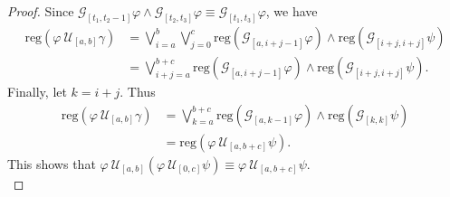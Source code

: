 \documentclass[runningheads]{llncs}
\renewcommand{\phi}{\varphi}
\begin{document}
\begin{proof}
Since $\mathcal{G}_{[t_1,t_2-1]}\phi \land \mathcal{G}_{[t_2,t_3]} \phi \equiv \mathcal{G}_{[t_1,t_3]} \phi$, we have
\begin{align*}
\text{reg}\left(\phi \ \mathcal{U}_{[a,b]}\gamma\right) &= \bigvee_{i=a}^{b}  \bigvee_{j=0}^{c} \text{reg}\left(\mathcal{G}_{[a,i+j-1]}\phi\right) \land \text{reg}\left(\mathcal{G}_{[i+j, i+j]}\psi  \right)\\
&= \bigvee_{i+j=a}^{b+c} \text{reg}\left(\mathcal{G}_{[a,i+j-1]}\phi\right) \land \text{reg}\left(\mathcal{G}_{[i+j, i+j]}\psi  \right).
\end{align*}
Finally, let $k = i + j$. Thus
\begin{align*}
\text{reg}\left(\phi \ \mathcal{U}_{[a,b]}\gamma\right) &= \bigvee_{k=a}^{b+c} \text{reg}\left(\mathcal{G}_{[a,k-1]}\phi\right) \land \text{reg}\left(\mathcal{G}_{[k, k]}\psi  \right) \\
&= \text{reg}\left(\phi \ \mathcal{U}_{[a,b+c]} \psi\right).
\end{align*}
This shows that $\phi \ \mathcal{U}_{[a,b]}(\phi \ \mathcal{U}_{[0,c]} \psi) \equiv \phi \ \mathcal{U}_{[a,b+c]} \psi$.\\


\end{proof}
\end{document}
